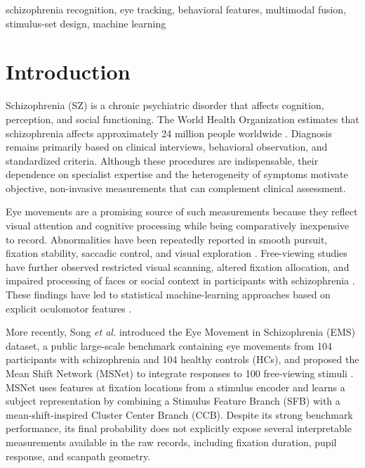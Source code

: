 \documentclass[conference,a4paper]{IEEEtran}
\begin{document}
\begin{IEEEkeywords}
schizophrenia recognition, eye tracking, behavioral features, multimodal fusion, stimulus-set design, machine learning
\end{IEEEkeywords}

\section{Introduction}
Schizophrenia (SZ) is a chronic psychiatric disorder that affects cognition, perception, and social functioning. The World Health Organization estimates that schizophrenia affects approximately 24 million people worldwide \cite{who2022schizophrenia}. Diagnosis remains primarily based on clinical interviews, behavioral observation, and standardized criteria. Although these procedures are indispensable, their dependence on specialist expertise and the heterogeneity of symptoms motivate objective, non-invasive measurements that can complement clinical assessment.

Eye movements are a promising source of such measurements because they reflect visual attention and cognitive processing while being comparatively inexpensive to record. Abnormalities have been repeatedly reported in smooth pursuit, fixation stability, saccadic control, and visual exploration \cite{morita2020characteristics,wolf2021review}. Free-viewing studies have further observed restricted visual scanning, altered fixation allocation, and impaired processing of faces or social context in participants with schizophrenia \cite{patel2020social,wolf2021review}. These findings have led to statistical machine-learning approaches based on explicit oculomotor features \cite{benson2012simple,morita2017integrated,huang2020effective,kacur2020analysis}.

More recently, Song \emph{et al.} introduced the Eye Movement in Schizophrenia (EMS) dataset, a public large-scale benchmark containing eye movements from 104 participants with schizophrenia and 104 healthy controls (HCs), and proposed the Mean Shift Network (MSNet) to integrate responses to 100 free-viewing stimuli \cite{song2024ems}. MSNet uses features at fixation locations from a stimulus encoder and learns a subject representation by combining a Stimulus Feature Branch (SFB) with a mean-shift-inspired Cluster Center Branch (CCB). Despite its strong benchmark performance, its final probability does not explicitly expose several interpretable measurements available in the raw records, including fixation duration, pupil response, and scanpath geometry.
\end{document}

